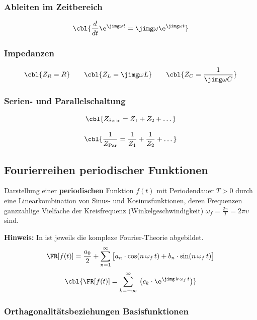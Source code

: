 \subsubsection{Ableiten im Zeitbereich}

\[
\cbl{\frac{d}{dt} \e^{\jimg \omega t} = \jimg \omega \e^{\jimg \omega t}}
\]

\subsubsection{Impedanzen}

\[
\cbl{Z_R = R}
\qquad
\cbl{Z_L = \jimg \omega L}
\qquad
\cbl{Z_C = \frac{1}{\jimg \omega C}}
\]

\subsubsection{Serien- und Parallelschaltung}

\[
\cbl{Z_{\mathrm{Serie}} = Z_1 + Z_2 + \dots}
\]

\[
\cbl{\frac{1}{Z_{\mathrm{Par}}} = \frac{1}{Z_1} + \frac{1}{Z_2} + \dots}
\]

\subsection{Fourierreihen periodischer Funktionen}

Darstellung einer \textbf{periodischen} Funktion $f(t)$ mit Periodendauer $T > 0$ durch eine Linearkombination von Sinus- und Kosinusfunktionen,
deren Frequenzen ganzzahlige Vielfache der Kreisfrequenz (Winkelgeschwindigkeit) $\omega_f = \frac{2 \pi}{T} = 2 \pi v$ sind. 

\smallskip

\textbf{Hinweis:} In  ist jeweils die komplexe Fourier-Theorie abgebildet.
$$ \FR[f(t)] = \frac{a_0}{2} + \sum\limits _{n=1}^\infty \big[ a_n \cdot \cos(n \, \omega_f \, t) + b_n \cdot \sin(n \, \omega_f \, t) \big] $$
$$ \cbl{\FR[f(t)] = \sum\limits _{k = -\infty}^\infty \: \big( c_k \cdot \e^{\jimg \, k \, \omega_f \, t} \big)} $$


\subsubsection{Orthagonalitätsbeziehungen Basisfunktionen}

